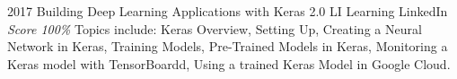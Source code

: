 \documentclass[11pt,a4paper]{moderncv}
\begin{document}
\cventry                                                                                                          %
    {2017}                                                                                                        %
    {Building Deep Learning Applications with Keras 2.0}                                                          %
    {LI Learning}                                                                                                 %
    {LinkedIn}                                                                                                    %
    {\textit{Score 100\%}}                                                                                        %
    {                                                                                                             %
        Topics include:                                                                                           %
            Keras Overview,                                                                                       %
            Setting Up,                                                                                           %
            Creating a Neural Network in Keras,                                                                   %
            Training Models,                                                                                      %
            Pre-Trained Models in Keras,                                                                          %
            Monitoring a Keras model with TensorBoardd,                                                           %
            Using a trained Keras Model in Google Cloud.                                                          %
    }                                                                                                             %
\end{document}
